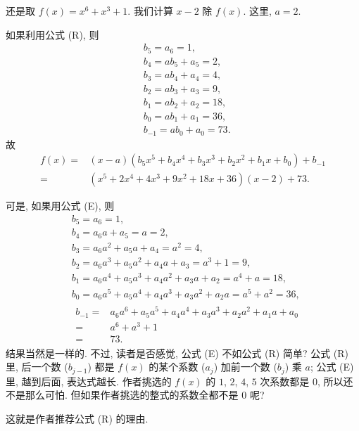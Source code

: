 \begin{example}
    还是取 $f(x) = x^6 + x^3 + 1$. 我们计算 $x - 2$ 除 $f(x)$. 这里, $a = 2$.

    如果利用公式 (R), 则
    \begin{align*}
         & b_5 = a_6 = 1,            \\
         & b_4 = ab_5 + a_5 = 2,     \\
         & b_3 = ab_4 + a_4 = 4,     \\
         & b_2 = ab_3 + a_3 = 9,     \\
         & b_1 = ab_2 + a_2 = 18,    \\
         & b_0 = ab_1 + a_1 = 36,    \\
         & b_{-1} = ab_0 + a_0 = 73.
    \end{align*}
    故
    \begin{align*}
        f(x)
        = {} & (x - a)(b_5 x^5 + b_4 x^4 + b_3 x^3 + b_2 x^2 + b_1 x + b_0) + b_{-1} \\
        = {} & (x^5 + 2x^4 + 4x^3 + 9x^2 + 18x + 36) (x-2) + 73.
    \end{align*}

    可是, 如果用公式 (E), 则
    \begin{align*}
         & b_5 = a_6 = 1,                                                        \\
         & b_4 = a_6 a + a_5 = a = 2,                                            \\
         & b_3 = a_6 a^2 + a_5 a + a_4 = a^2 = 4,                                \\
         & b_2 = a_6 a^3 + a_5 a^2 + a_4 a + a_3 = a^3 + 1 = 9,                  \\
         & b_1 = a_6 a^4 + a_5 a^3 + a_4 a^2 + a_3 a + a_2 = a^4 + a = 18,       \\
         & b_0 = a_6 a^5 + a_5 a^4 + a_4 a^3 + a_3 a^2 + a_2 a = a^5 + a^2 = 36, \\
         & \begin{aligned}
            b_{-1}
            = {} & a_6 a^6 + a_5 a^5 + a_4 a^4 + a_3 a^3 + a_2 a^2 + a_1 a + a_0 \\
            = {} & a^6 + a^3 + 1                                                 \\
            = {} & 73.
        \end{aligned}
    \end{align*}
    结果当然是一样的. 不过, 读者是否感觉, 公式 (E) 不如公式 (R) 简单? 公式 (R) 里, 后一个数 ($b_{j-1}$) 都是 $f(x)$ 的某个系数 ($a_j$) 加前一个数 ($b_j$) 乘 $a$; 公式 (E) 里, 越到后面, 表达式越长. 作者挑选的 $f(x)$ 的 $1$, $2$, $4$, $5$ 次系数都是 $0$, 所以还不是那么可怕. 但如果作者挑选的整式的系数全都不是 $0$ 呢?

    这就是作者推荐公式 (R) 的理由.
\end{example}

